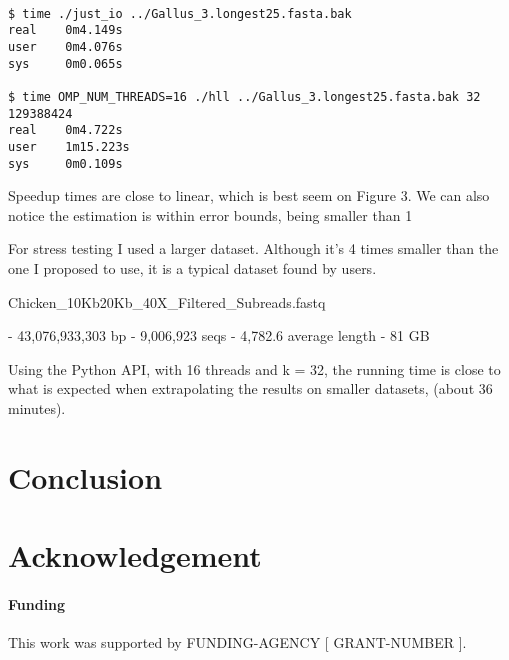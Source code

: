 \documentclass{bioinfo}
\begin{document}
\begin{verbatim}

$ time ./just_io ../Gallus_3.longest25.fasta.bak
real    0m4.149s
user    0m4.076s
sys     0m0.065s

$ time OMP_NUM_THREADS=16 ./hll ../Gallus_3.longest25.fasta.bak 32
129388424
real    0m4.722s
user    1m15.223s
sys     0m0.109s

\end{verbatim}

Speedup times are close to linear,
which is best seem on Figure 3.
We can also notice the estimation is within error bounds,
being smaller than 1%

For stress testing I used a larger dataset.
Although it's 4 times smaller than the one I proposed to use,
it is a typical dataset found by users.

Chicken\_10Kb20Kb\_40X\_Filtered\_Subreads.fastq

  - 43,076,933,303 bp
  - 9,006,923 seqs
  - 4,782.6 average length
  - 81 GB

Using the Python API, with 16 threads and k = 32,
the running time is close to what is expected when extrapolating the
results on smaller datasets,
(about 36 minutes).


\section{Conclusion}

\section*{Acknowledgement}

\paragraph{Funding\textcolon} This work was supported by FUNDING-AGENCY [ GRANT-NUMBER ].


%
%
%
%
%
%
%

\end{document}
